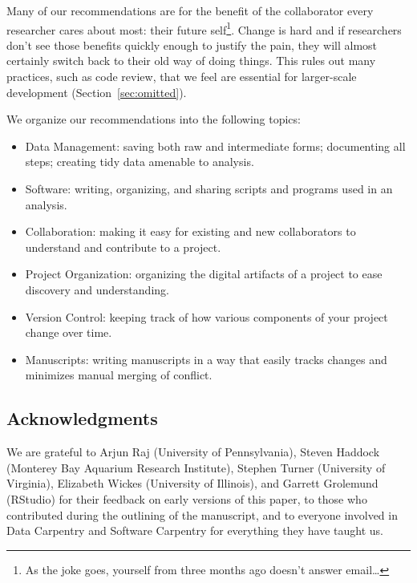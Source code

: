 \documentclass[10pt,letterpaper]{article}
\begin{document}
Many of our recommendations are for the benefit of the collaborator
every researcher cares about most: their future self\footnote{As the
joke goes, yourself from three months ago doesn't answer
email{\ldots}}. Change is hard and if researchers don't see those benefits
quickly enough to justify the pain,
they will almost certainly switch back to their old way
of doing things.  This rules out many practices, such as code review,
that we feel are essential for larger-scale development
(Section~\ref{sec:omitted}).

We organize our recommendations into the following topics:

\begin{itemize}

\item Data Management:
  saving both raw and intermediate forms; documenting all steps; creating tidy data amenable to analysis.

\item Software:
  writing, organizing, and sharing scripts and programs used in an analysis.

\item Collaboration:
  making it easy for existing and new collaborators to understand and contribute to a project.

\item Project Organization:
  organizing the digital artifacts of a project to ease discovery and understanding.

\item Version Control:
  keeping track of how various components of your project change over time.

\item Manuscripts:
  writing manuscripts in a way that easily tracks changes and minimizes manual merging of conflict.

\end{itemize}

\subsection*{Acknowledgments}

We are grateful to Arjun Raj (University of Pennsylvania), Steven
Haddock (Monterey Bay Aquarium Research Institute), Stephen Turner
(University of Virginia), Elizabeth Wickes (University of Illinois),
and Garrett Grolemund (RStudio) for their feedback on early versions
of this paper, to those who contributed during the outlining of the
manuscript, and to everyone involved in Data Carpentry and Software
Carpentry for everything they have taught us.
\end{document}
